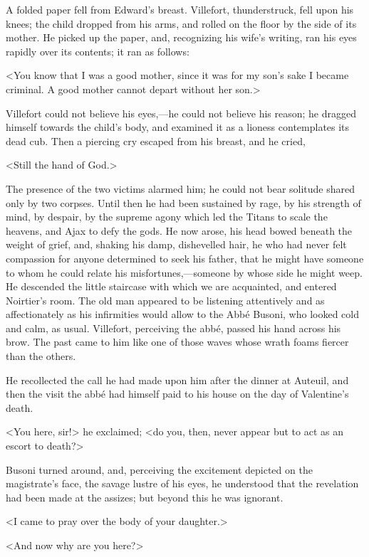  A folded paper fell from Edward's breast. Villefort, thunderstruck, fell upon his knees; the child dropped from his arms, and rolled on the floor by the side of its mother. He picked up the paper, and, recognizing his wife's writing, ran his eyes rapidly over its contents; it ran as follows: 

 <You know that I was a good mother, since it was for my son's sake I became criminal. A good mother cannot depart without her son.> 

 Villefort could not believe his eyes,—he could not believe his reason; he dragged himself towards the child's body, and examined it as a lioness contemplates its dead cub. Then a piercing cry escaped from his breast, and he cried, 

 <Still the hand of God.> 

 The presence of the two victims alarmed him; he could not bear solitude shared only by two corpses. Until then he had been sustained by rage, by his strength of mind, by despair, by the supreme agony which led the Titans to scale the heavens, and Ajax to defy the gods. He now arose, his head bowed beneath the weight of grief, and, shaking his damp, dishevelled hair, he who had never felt compassion for anyone determined to seek his father, that he might have someone to whom he could relate his misfortunes,—someone by whose side he might weep.  He descended the little staircase with which we are acquainted, and entered Noirtier's room. The old man appeared to be listening attentively and as affectionately as his infirmities would allow to the Abbé Busoni, who looked cold and calm, as usual. Villefort, perceiving the abbé, passed his hand across his brow. The past came to him like one of those waves whose wrath foams fiercer than the others. 

 He recollected the call he had made upon him after the dinner at Auteuil, and then the visit the abbé had himself paid to his house on the day of Valentine's death. 

 <You here, sir!> he exclaimed; <do you, then, never appear but to act as an escort to death?> 

 Busoni turned around, and, perceiving the excitement depicted on the magistrate's face, the savage lustre of his eyes, he understood that the revelation had been made at the assizes; but beyond this he was ignorant. 

 <I came to pray over the body of your daughter.> 

 <And now why are you here?> 

